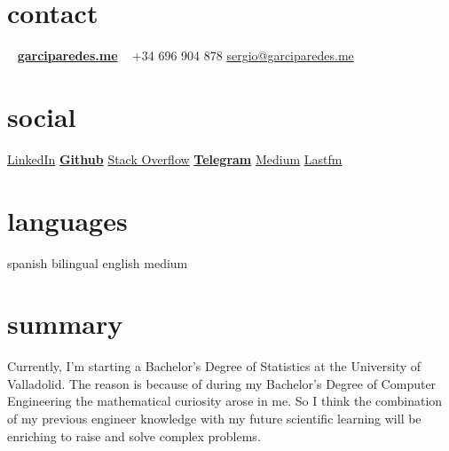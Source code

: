 \documentclass[]{friggeri-cv} %
\begin{document}


    \begin{aside} %

        \section{contact}
            ~
            \href{http://garciparedes.me}{\textbf{garciparedes.me}}
            ~
            +34 696 904 878
            \href{mailto:sergio@garciparedes.me}{sergio@garciparedes.me}
        \section{social}
            \href{https://es.linkedin.com/in/garciparedes/en}{LinkedIn\quad\faLinkedin }
            \href{https://github.com/garciparedes}{\quad{\color{red} $\varheartsuit$}\quad\textbf{Github}\quad\faGithub }
            \href{http://stackoverflow.com/users/3921457/garciparedes}{Stack Overflow\quad\faStackOverflow }
            \href{https://telegram.me/garciparedes}{\textbf{Telegram}\quad\faPaperPlane }
            \href{https://medium.com/@garciparedes}{Medium\quad\faMedium }
            \href{http://www.last.fm/user/garciparedes/}{Lastfm\quad\faLastfm}
        \section{languages}
            spanish bilingual
            english medium
    \end{aside}




    \section{summary}

        Currently, I'm starting a Bachelor's Degree of Statistics at the University of Valladolid. The reason is because of during my Bachelor's Degree of Computer Engineering the mathematical curiosity arose in me. So I think the combination of my previous engineer knowledge with my future scientific learning will be enriching to raise and solve complex problems.
\end{document}
